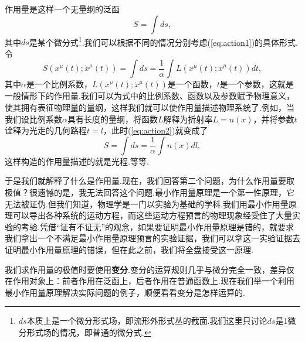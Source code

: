 		作用量是这样一个无量纲的泛函
		\begin{equation}\label{eq:action1}
			S=\int ds,
		\end{equation}
		其中$ds$是某个微分式\footnote{$ds$本质上是一个微分形式场，即流形外形式丛的截面.我们这里只讨论$ds$是1微分形式场的情况，即普通的微分式.}.我们可以根据不同的情况分别考虑(\ref{eq:action1})的具体形式.令
		\begin{equation}\label{eq:action2}
			S(x^\mu(t);\dot{x}^\mu(t))=\int ds=\frac{1}{\alpha}\int L(x^\mu(t);\dot{x}^\mu(t))dt,
		\end{equation}
		其中$\alpha$是一个比例系数，$L(x^\mu(t);\dot{x}^\mu(t))$是一个函数，$t$是一个参数，这就是一般情形下的作用量.我们可以为式中的比例系数、函数以及参数赋予物理意义，使其拥有表征物理量的量纲，这样我们就可以使作用量描述物理系统了.例如，当我们设比例系数$\alpha$具有长度的量纲，将函数$L$解释为折射率$L=n(x)$，并将参数$t$诠释为光走的几何路程$t=l$，此时(\ref{eq:action2})就变成了
		$$S=\int ds=\frac{1}{\alpha}\int n(x)dl,$$
		这样构造的作用量描述的就是光程.等等.

		于是我们就解释了什么是作用量.现在，我们回答第二个问题，为什么作用量要取极值？很遗憾的是，我无法回答这个问题.最小作用量原理是一个第一性原理，它无法被证伪.但我们知道，物理学是一门以实验为基础的学科.我们用最小作用量原理可以导出各种系统的运动方程，而这些运动方程预言的物理现象经受住了大量实验的考验.凭借“证有不证无”的观念，如果要证明最小作用量原理是错的，就要求我们拿出一个不满足最小作用量原理预言的实验证据，我们可以拿这一实验证据去证明最小作用量原理的错误，但在此之前，我们将全盘接受这一原理.

		我们求作用量的极值时要使用\textbf{变分}.变分的运算规则几乎与微分完全一致，差异仅在作用对象上：前者作用在泛函上，后者作用在普通函数上.现在我们举一个利用最小作用量原理解决实际问题的例子，顺便看看变分是怎样运算的.
		
		